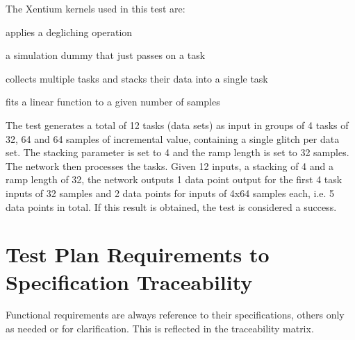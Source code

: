 \noindent
The Xentium kernels used in this test are:

\begin{description}[labelwidth=4em,leftmargin=\parindent,labelindent=\parindent]
	\item[\textbf{deglitch}] applies a degliching operation
	\item[\textbf{dummy}]	 a simulation dummy that just passes on a task
	\item[\textbf{stack}]	 collects multiple tasks and stacks their data into a single task
	\item[\textbf{rampfit}]	 fits a linear function to a given number of samples
\end{description}

\noindent
The test generates a total of 12 tasks (data sets) as input in groups of 4 tasks
of 32, 64 and 64 samples of incremental value, containing a single glitch per
data set. The stacking parameter is set to 4 and the ramp length is set to 32
samples.\\

\noindent
The network then processes the tasks. Given 12 inputs, a stacking of 4 and a
ramp length of 32, the network outputs 1 data point output for the first 4 task
inputs of 32 samples and 2 data points for inputs of 4x64 samples each,
i.e. 5 data points in total. If this result is obtained, the test is considered
a success.\\







\chapter{Test Plan Requirements to Specification Traceability}

\noindent
Functional requirements are always reference to their specifications, others
only as needed or for clarification. This is reflected in the traceability
matrix.

\traceabilitymatrix



